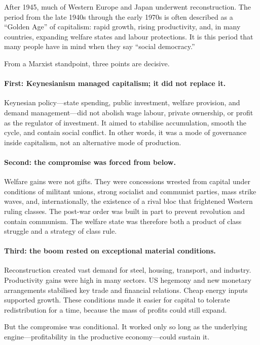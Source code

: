 After 1945, much of Western Europe and Japan underwent reconstruction. The period from the late 1940s through
the early 1970s is often described as a ``Golden Age'' of capitalism: rapid growth, rising productivity, and,
in many countries, expanding welfare states and labour protections. It is this period that many people have in
mind when they say ``social democracy.''

From a Marxist standpoint, three points are decisive.

\paragraph{First: Keynesianism managed capitalism; it did not replace it.}
Keynesian policy—state spending, public investment, welfare provision, and demand management—did not abolish
wage labour, private ownership, or profit as the regulator of investment. It aimed to stabilise accumulation,
smooth the cycle, and contain social conflict. In other words, it was a mode of governance inside capitalism,
not an alternative mode of production.

\paragraph{Second: the compromise was forced from below.}
Welfare gains were not gifts. They were concessions wrested from capital under conditions of militant unions,
strong socialist and communist parties, mass strike waves, and, internationally, the existence of a rival bloc
that frightened Western ruling classes. The post-war order was built in part to prevent revolution and contain
communism. The welfare state was therefore both a product of class struggle and a strategy of class rule.

\paragraph{Third: the boom rested on exceptional material conditions.}
Reconstruction created vast demand for steel, housing, transport, and industry. Productivity gains were high in
many sectors. US hegemony and new monetary arrangements stabilised key trade and financial relations. Cheap energy
inputs supported growth. These conditions made it easier for capital to tolerate redistribution for a time,
because the mass of profits could still expand.

But the compromise was conditional. It worked only so long as the underlying engine—profitability in the productive
economy—could sustain it.

